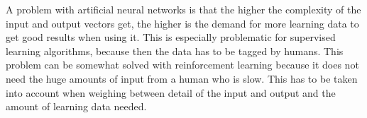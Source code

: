 A problem with artificial neural networks is that the higher the complexity of the input and output vectors get, the higher is the demand for more learning data to get good results when using it. This is especially problematic for supervised learning algorithms, because then the data has to be tagged by humans. This problem can be somewhat solved with reinforcement learning because it does not need the huge amounts of input from a human who is slow. This has to be taken into account when weighing between detail of the input and output and the amount of learning data needed.